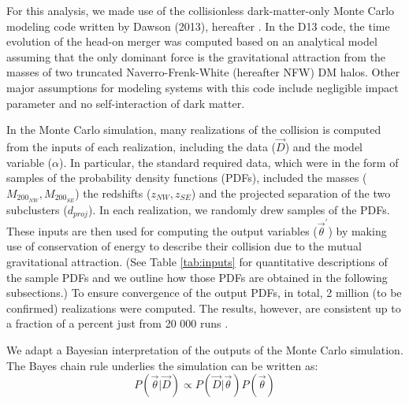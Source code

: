 For this analysis, we made use of the collisionless 
dark-matter-only Monte Carlo modeling code written by Dawson (2013),
hereafter .  
In the D13 code, the time evolution of the head-on merger was computed
based on an analytical model assuming that the only dominant force is the gravitational attraction from
the masses of two truncated Naverro-Frenk-White (hereafter NFW) DM halos.
Other major assumptions for modeling systems with this code include
negligible impact parameter and no self-interaction of dark matter.\par

In the Monte Carlo simulation, many realizations of the collision is
computed from the inputs of each realization, including
the data ($\vec{D}$) and the model variable ($\alpha$). In particular,
the standard required data, which were in the form of samples of the
probability density functions (PDFs), included the masses ($M_{200_{NW}},M_{200_{SE}}$) the
redshifts ($z_{NW}, z_{SE}$) and the projected separation of the two
subclusters ($d_{proj}$).  
In each realization, we randomly drew samples of the PDFs.
%
These inputs are then used for computing the output variables
($\vec{\theta}^\prime$) by making use of conservation of energy to describe
their collision due to the mutual gravitational attraction.
(See Table \ref{tab:inputs}
for quantitative descriptions of the sample PDFs and we outline how those
PDFs are obtained in the following subsections.) 
To ensure convergence of the output PDFs, in total, 2 million (to be
confirmed) realizations were computed. The results, however, are
consistent up to a fraction of a percent just from 20 000 runs
.\par    
We adapt a Bayesian interpretation of the outputs of the Monte Carlo
simulation. The Bayes chain rule underlies the simulation can be written as:
\begin{equation}
    P(\vec{\theta}|\vec{D}) \propto P(\vec{D}|\vec{\theta})P(\vec{\theta})
\end{equation}
